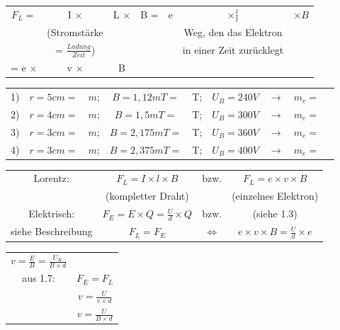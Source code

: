 \documentclass{report}
\begin{document}
	\begin{table}[h]		
		\begin{tabular}{ccccccc}
			$F_L =$ & I $\times$ & L $\times$ & B = & e & $\times \frac{l}{t}$ & $\times B$ \\
			 & (Stromstärke  & & & & Weg, den das Elektron & \\
			 & = $\frac{Ladung}{Zeit}$) & & & & in einer Zeit zurücklegt & \\
			 \hline
			 = e $\times$ & v $\times$ & B & & 
		\end{tabular}
	\end{table}
	
	\begin{table}[h]
		\begin{tabular}{ccccccccc}
			1) & $r=5cm=$ & $m$; & $B=1,12mT=$ & T; & $U_B=240V$ & $\to$ & $m_e=$ \\
			2) & $r=4cm=$ & $m$; & $B=1,5mT=$ & T; & $U_B=300V$ & $\to$ & $m_e=$ \\
			3) & $r=3cm=$ & $m$; & $B=2,175mT=$ & T; & $U_B=360V$ & $\to$ & $m_e=$ \\
			4) & $r=3cm=$ & $m$; & $B=2,375mT=$ & T; & $U_B=400V$ & $\to$ & $m_e=$ \\
		\end{tabular}
	\end{table}
	\newpage
	\begin{table}[h]
		\begin{tabular}{cccc}
			Lorentz: &$F_L = I \times l \times B$ & bzw. & $F_L = e \times v \times B$ \\
			&(kompletter Draht) & & (einzelnes Elektron) \\
			Elektrisch: &$F_E = E \times Q = \frac{U}{d} \times Q$ & bzw. & (siehe 1.3) \\
			siehe Beschreibung & $F_L = F_E$ & $\Leftrightarrow$ & $e \times v \times B = \frac{U}{d} \times e$ \\
		\end{tabular}
	\end{table}
	
	\newpage
	
	\begin{table}[h]
		\begin{tabular}{cc}
			$v = \frac{E}{B} = \frac{U_K}{B \times d}$ & \\
			aus 1.7: & $F_E = F_L$ \\
			& $v = \frac{U}{v \times d}$ \\
			& $v = \frac{U}{B \times d}$ \\
		\end{tabular}
	\end{table}
	
\end{document}

